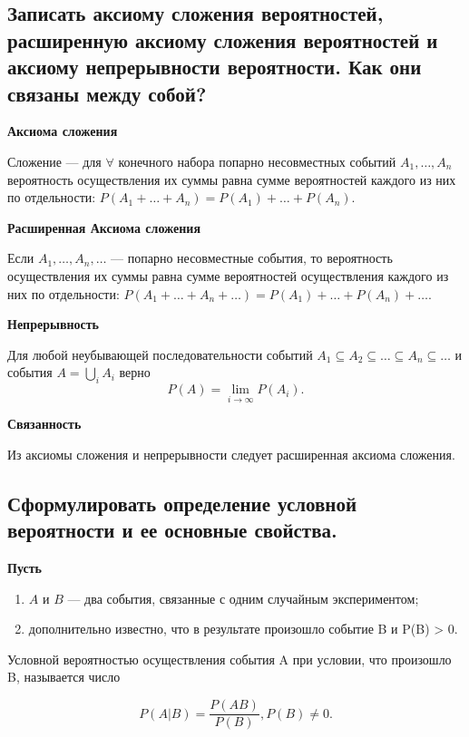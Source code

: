 \subsection{Записать аксиому сложения вероятностей, расширенную аксиому сложения вероятностей и аксиому непрерывности вероятности. Как они связаны между собой?}

\textbf{Аксиома сложения}

Сложение --- для $\forall$ конечного набора попарно несовместных событий $A_1, \dots, A_n$ вероятность осуществления их суммы равна сумме вероятностей каждого из них по отдельности: $P(A_1 + \dots + A_n) = P(A_1) + \dots + P(A_n)$.

\textbf{Расширенная Аксиома сложения}

Если $A_1, \dots, A_n, \dots$ --- попарно несовместные события, то вероятность осуществления их суммы равна сумме вероятностей осуществления каждого из них по отдельности: $P(A_1 + \dots + A_n + \dots) = P(A_1) + \dots + P(A_n) + \dots$.

\textbf{Непрерывность}

Для любой неубывающей последовательности событий $A_1 \subseteq A_2 \subseteq \dots \subseteq A_n \subseteq \dots$ и события $ A = \bigcup\limits_i A_i$ верно 
\begin{equation}
	P(A) = \lim\limits_{i \rightarrow \infty} P(A_i).
\end{equation}

\textbf{Связанность}

Из аксиомы сложения и непрерывности следует расширенная аксиома сложения.

\subsection{Сформулировать определение условной вероятности и ее основные свойства.}

\textbf{Пусть} 

\begin{enumerate}
	\item $A$ и $B$ --- два события, связанные с одним случайным экспериментом;
	\item дополнительно известно, что в результате произошло событие B и P(B) > 0.
\end{enumerate}

Условной вероятностью осуществления события A при условии, что произошло B, называется число

\begin{equation}
	P(A|B) = \frac{P(AB)}{P(B)}, P(B) \neq 0.
\end{equation}

